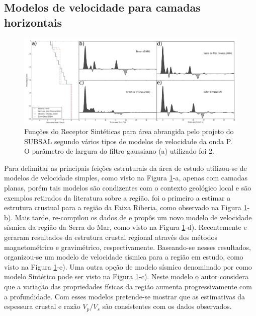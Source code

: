 \subsection{Modelos de velocidade para camadas horizontais}

\begin{figure}[!ht]
\centering
\includegraphics[scale=0.22]{Figs/modelagem_RF.png}
\caption{Funções do Receptor Sintéticas para área abrangida pelo projeto do SUBSAL segundo vários tipos de modelos de velocidade da onda P. O parâmetro de largura do filtro gaussiano (a) utilizado foi 2.}
\label{modelagem}
\end{figure}

Para delimitar as principais feições estruturais da área de estudo utilizou-se de modelos de velocidade simples, como visto na Figura \ref{modelagem}-a, apenas com camadas planas, porém tais modelos são condizentes com o contexto geológico local e são exemplos retirados da literatura sobre a região. \cite{Bassini_1986} foi o primeiro a estimar a estrutura crustual para a região da Faixa Riberia, como observado na Figura \ref{modelagem}-b). Mais tarde, \cite{sand_franca_crustal_2004} re-compilou os dados de \cite{Bassini_1986} e propôs um novo modelo de velocidade sísmica da região da Serra do Mar, como visto na Figura \ref{modelagem}-d). Recentemente \cite{flora_solon_ancient_2013} e \cite{Silva_2014} geraram resultados da estrutura crustal regional através dos métodos magnetométrico e gravimétrico, respectivamente. Baseando-se nesses resultados, organizou-se um modelo de velocidade sísmica para a região em estudo, como visto na Figura \ref{modelagem}-e). Uma outra opção de modelo sísmico denominado por \cite{sand_franca_crustal_2004} como modelo Sintético pode ser visto na Figura \ref{modelagem}-c). Neste modelo o autor considera que a variação das propriedades físicas da região aumenta progressivamente com a profundidade. Com esses modelos pretende-se mostrar que as estimativas da espessura crustal e razão $V_{p}/V_{s}$ são consistentes com os dados observados.

